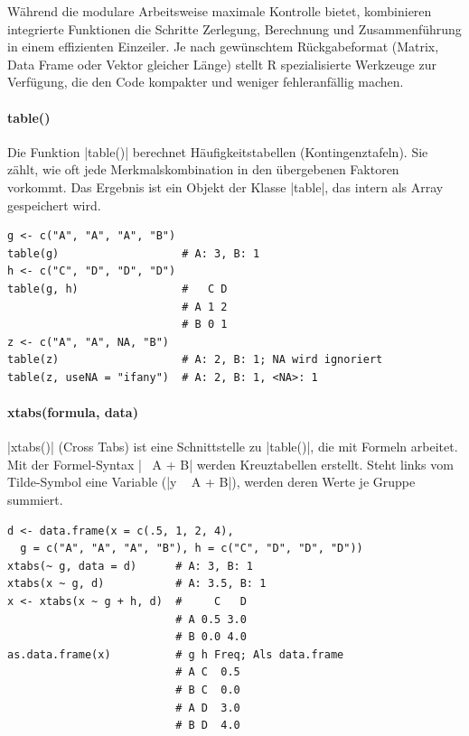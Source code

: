 \documentclass[10pt,twocolumn]{scrartcl}
\renewcommand{\lstinline}{\mycoloredinline}
\begin{document}
Während die modulare Arbeitsweise maximale Kontrolle bietet, kombinieren integrierte Funktionen die Schritte Zerlegung, Berechnung und Zusammenführung in einem effizienten Einzeiler. Je nach gewünschtem Rückgabeformat (Matrix, Data Frame oder Vektor gleicher Länge) stellt R spezialisierte Werkzeuge zur Verfügung, die den Code kompakter und weniger fehleranfällig machen.

\paragraph{table()}

Die Funktion \lstinline|table()| berechnet Häufigkeitstabellen (Kontingenztafeln). Sie zählt, wie oft jede Merkmalskombination in den übergebenen Faktoren vorkommt. Das Ergebnis ist ein Objekt der Klasse \lstinline|table|, das intern als Array gespeichert wird.

\begin{lstlisting}
g <- c("A", "A", "A", "B")
table(g)                   # A: 3, B: 1
h <- c("C", "D", "D", "D")
table(g, h)                #   C D
                           # A 1 2
                           # B 0 1
z <- c("A", "A", NA, "B")
table(z)                   # A: 2, B: 1; NA wird ignoriert
table(z, useNA = "ifany")  # A: 2, B: 1, <NA>: 1
\end{lstlisting}


\paragraph{xtabs(formula, data)}

\lstinline|xtabs()| (Cross Tabs) ist eine Schnittstelle zu \lstinline|table()|, die mit Formeln arbeitet. Mit der Formel-Syntax \lstinline|~ A + B| werden Kreuztabellen erstellt. Steht links vom Tilde-Symbol eine Variable (\lstinline|y ~ A + B|), werden deren Werte je Gruppe summiert.

\begin{lstlisting}
d <- data.frame(x = c(.5, 1, 2, 4),
  g = c("A", "A", "A", "B"), h = c("C", "D", "D", "D"))
xtabs(~ g, data = d)      # A: 3, B: 1
xtabs(x ~ g, d)           # A: 3.5, B: 1
x <- xtabs(x ~ g + h, d)  #     C   D
                          # A 0.5 3.0
                          # B 0.0 4.0
as.data.frame(x)          # g h Freq; Als data.frame
                          # A C  0.5
                          # B C  0.0
                          # A D  3.0
                          # B D  4.0
\end{lstlisting}
\end{document}
